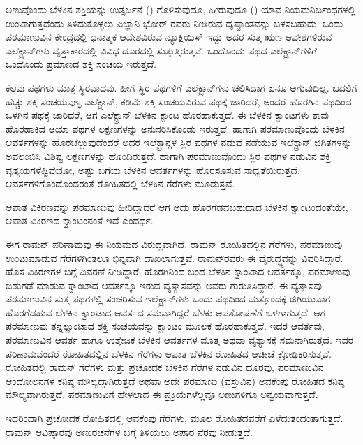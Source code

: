 ಅಣುವೊಂದು ಬೆಳಕಿನ ಶಕ್ತಿಯನ್ನು ಉತ್ಸರ್ಜನೆ () ಗೊಳಿಸುವುದೂ, ಹೀರುವುದೂ () ಯಾವ ನಿಯಮ\enginline{-}ನಿರ್ಬಂಧಗಳಲ್ಲಿ ಉಂಟಾಗುತ್ತದೆಂದು ತಿಳಿದುಕೊಳ್ಳಲು ವಿಜ್ಞಾನಿ ಭೋರ್ ರವರು ನೀಡಿರುವ ದೃಷ್ಟಾಂತವನ್ನು ಬಳಸಬಹುದು. ಒಂದು ಪರಮಾಣುವಿನ ಕೇಂದ್ರದಲ್ಲಿ ಧನಾತ್ಮಕ ಆವೇಶವಿರುವ ನ್ಯೂಕ್ಲಿಯಿಸ್ ಇದ್ದು ಅದರ ಸುತ್ತ ಋಣ ಆವೇಶಗಳಿರುವ ಎಲೆಕ್ಟ್ರಾನ್‍ಗಳು ವೃತ್ತಾಕಾರದಲ್ಲಿ ವಿವಿಧ ದೂರದಲ್ಲಿ ಸುತ್ತುತ್ತಿರುತ್ತವೆ. ಒಂದೊಂದು ಪಥದ ಎಲೆಕ್ಟ್ರಾನ್‌ಗಳಿಗೆ ಒಂದೊಂದು ಪ್ರಮಾಣದ ಶಕ್ತಿ ಸಂಚಯ ಇರುತ್ತದೆ.

ಕೆಲವು ಪಥಗಳು ಮಾತ್ರ ಸ್ಥಿರವಾದವು. ಹೀಗೆ ಸ್ಥಿರ ಪಥಗಳಿಗೆ ಎಲೆಕ್ಟ್ರಾನ್‍ಗಳು ಚಲಿಸಿದಾಗ ಏನೂ ಆಗುವುದಿಲ್ಲ. ಬದಲಿಗೆ ಹೆಚ್ಚು ಶಕ್ತಿ ಸಂಚಯವುಳ್ಳ ಎಲೆಕ್ಟ್ರಾನ್, ಕಡಿಮೆ ಶಕ್ತಿ ಸಂಚಯವಿರುವ ಪಥಕ್ಕೆ ಜಾರಿದರೆ, ಅಂದರೆ ಹೊರಗಿನ ಪಥದಿಂದ ಒಳಗಿನ ಪಥಕ್ಕೆ ಜಾರಿದರೆ, ಆಗ ಎಲೆಕ್ಟ್ರಾನ್ ಬೆಳಕಿನ ಕ್ಟಾಂಟ ಹೊರಹಾಕುತ್ತದೆ. ಈ ಬೆಳಕಿನ ಕ್ವಾಂಟಗಳು ತಾವು ಹೊರಹಾಕಿದ ಆಯಾ ಪಥಗಳ ಲಕ್ಷಣಗಳನ್ನು ಅನುಸರಿಸಿಕೊಂಡು ಇರುತ್ತವೆ. ಹಾಗಾಗಿ ಪರಮಾಣುವೊಂದು ಬೆಳಕಿನ ಆವರ್ತಗಳನ್ನು ಹೊರಚೆಲ್ಲುವುದೆಂದರೆ ಅದರ ಇಲೆಕ್ಟ್ರಾನ್ಗಳ ಸ್ಥಿರ ಪಥಗಳ ನಡುವೆ ನಡೆಯುವ ಇಲೆಕ್ಟ್ರಾನ್ ಜಿಗಿತಗಳನ್ನು ಅವಲಂಬಿಸಿ ವಿಶಿಷ್ಟ ಲಕ್ಷಣಗಳನ್ನು ಹೊಂದಿರುತ್ತದೆ. ಹಾಗಾಗಿ ಪರಮಾಣುವೊಂದು ಸ್ಥಿರ ಪಥಗಳ ನಡುವಿನ ಶಕ್ತಿ ವ್ಯತ್ಯಯಗಳೆಷ್ಟಿವೆಯೋ, ಅಷ್ಟು ಬಗೆಯ ಬೆಳಕಿನ ಆವರ್ತಗಳನ್ನು ಹೊರಸೂಸುವ ಸಾಧ್ಯತೆಯಿರುತ್ತದೆ. ಆವರ್ತಗಳಿಗೊಂದೊಂದರಂತೆ ರೋಹಿತದಲ್ಲಿ ಬೆಳಕಿನ ಗೆರೆಗಳು ಮೂಡುತ್ತವೆ.

ಆಪಾತ ವಿಕಿರಣವನ್ನು ಪರಮಾಣುವು ಹೀರಿದ್ದಾದರೆ ಆಗ ಅದು ಹೊರಗೆಡವಬಹುದಾದ ಬೆಳಕಿನ ಕ್ವಾಂಟಂದಂತೆಯೇ, ಆಪಾತ ವಿಕಿರಣದ ಕ್ವಾಂಟಂನಂತೆ ಇದೆ ಎಂದರ್ಥ.

ಈಗ ರಾಮನ್ ಪರಿಣಾಮವು ಈ ನಿಯಮದ ವಿರುದ್ಧವಾಗಿದೆ. ರಾಮನ್ ರೋಹಿತದಲ್ಲಿನ\break {} ಗೆರೆಗಳು, ಪರಮಾಣುವು ಉಂಟುಮಾಡುವ ಗೆರೆಗಳಿಗಿಂತಲೂ ಭಿನ್ನವಾಗಿ ದಾಖಲಾಗುತ್ತವೆ. ರಾಮನ್‍ರವರು ಈ ವೈರುದ್ಧ್ಯವನ್ನು ವಿವರಿಸಿದ್ದಾರೆ. ಹೊಸ ವಿಕಿರಣಗಳ ಬಗ್ಗೆ ವಿವರಣೆ ನೀಡಿದ್ದಾರೆ. ಹೊರಗಿನಿಂದ ಬಂದ ಬೆಳಕಿನ ಕ್ವಾಂಟಾದ ಆವರ್ತಕ್ಕೂ, ಪರಮಾಣುವು ಬಿಡುಗಡೆ ಮಾಡುವ ಕ್ವಾಂಟಾದ ಆವರ್ತಕ್ಕೂ ಇರುವ ವ್ಯತ್ಯಾಸವನ್ನು ಅವರು ಗುರುತಿಸಿದ್ದಾರೆ. ಈ ವ್ಯತ್ಯಾಸವು ಪರಮಾಣುವಿನ ಸುತ್ತ ಪಥಗಳಲ್ಲಿ ಸಂಚರಿಸುವ ಇಲೆಕ್ಟ್ರಾನ್‍ಗಳು ಒಂದು ಪಥದಿಂದ ಮತ್ತೊಂದಕ್ಕೆ ಜಿಗಿಯುವಾಗ ಹೊರಗೆಡಹುವ ಬೆಳಕಿನ ಕ್ವಾಂಟಾದ ಆವರ್ತದ ಸಮವಾಗಿದ್ದರೆ ಬೆಳಕು ಅಪಶೋಷಣೆಗೆ ಒಳಗಾಗುತ್ತದೆ. ಆಗ ಪರಮಾಣುವು ತನ್ನಲ್ಲುಂಟಾದ ಶಕ್ತಿ ಸಂಚಯವನ್ನು ಕ್ವಾಂಟಂ ಮೂಲಕ ಹೊರಹಾಕುತ್ತದೆ. ಇದರ ಆವರ್ತವು, ಪರಮಾಣುವಿನ ಆವರ್ತ ಹಾಗೂ ಉತ್ತೇಜಕ ಬೆಳಕಿನ ಆವರ್ತಗಳ ಮೊತ್ತ ಅಥವಾ ವ್ಯತ್ಯಾಸಕ್ಕೆ ಸಮನಾಗಿರುತ್ತದೆ. ಇದರ ಪರಿಣಾಮವೆಂದರೆ ರೋಹಿತದಲ್ಲಿನ ಬೆಳಕಿನ ಗೆರೆಗಳು ಆಪಾತ ಬೆಳಕಿನ ರೋಹಿತದ ಆಚೀಚೆ ಕ್ರೋಢಿಕರಿಸುತ್ತವೆ. ರೋಹಿತದಲ್ಲಿ ರಾಮನ್ ಗೆರೆಗಳು ಮತ್ತು ಪ್ರಚೋದಕ ಬೆಳಕಿನ ಗೆರೆಗಳ ನಡುವಿನ ದೂರವು, ಪರಮಾಣುವಿನ ಆಂದೋಲನಗಳ ಕನಿಷ್ಠ ಮೌಲ್ಯದ್ದಾಗಿರುತ್ತದೆ ಅಥವಾ ಅದೇ ಪರಮಾಣು (ವಸ್ತುವಿನ) ಅವಕೆಂಪು ರೋಹಿತದ ಕನಿಷ್ಠ ಮೌಲ್ಯವಾಗಿರುತ್ತದೆ. ಪರಮಾಣುವಿಗೆ ಹೇಳಲಾದ ಈ ಪ್ರಕ್ರಿಯೆಗಳೆಲ್ಲವೂ ಅಣುಗಳಿಗೂ ಅನ್ವಯವಾಗುತ್ತದೆ.

ಇದರಿಂದಾಗಿ ಪ್ರಚೋದಕ ರೋಹಿತದಲ್ಲಿ ಆವಕೆಂಪು ಗೆರೆಗಳು, ಮೂಲ ರೋಹಿತದವರೆಗೆ ಎಳೆದುತಂದಂತಾಗುತ್ತದೆ. ರಾಮನ್ ಆವಿಷ್ಕಾರವು ಅಣುರಚನೆಗಳ ಬಗ್ಗೆ ತಿಳಿಯಲು ಅಪಾರ ನೆರವು ನೀಡುತ್ತದೆ.

